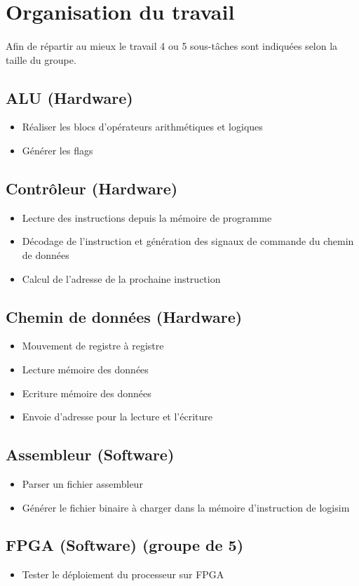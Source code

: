 \section{Organisation du travail}

\paragraph{}
	Afin de répartir au mieux le travail 4 ou 5 sous-tâches sont indiquées selon la taille du groupe.

\subsection{ALU (Hardware)}

\begin{itemize}
	\item Réaliser les blocs d'opérateurs arithmétiques et logiques
	\item Générer les flags
\end{itemize}

\subsection{Contrôleur (Hardware)}

\begin{itemize}
	\item Lecture des instructions depuis la mémoire de programme 
	\item Décodage de l'instruction et génération des signaux de commande du chemin de données
	\item Calcul de l'adresse de la prochaine instruction
\end{itemize}

\subsection{Chemin de données (Hardware)}

\begin{itemize}
	\item Mouvement de registre à registre
 	\item Lecture mémoire des données
	\item Ecriture mémoire des données
	\item Envoie d'adresse pour la lecture et l'écriture
\end{itemize}

\subsection{Assembleur (Software)}

\begin{itemize}
	\item Parser un fichier assembleur 
	\item Générer le fichier binaire à charger dans la mémoire d'instruction de logisim
\end{itemize}

\subsection{FPGA (Software) (groupe de 5)}

\begin{itemize}
	\item Tester le déploiement du processeur sur FPGA 
\end{itemize}

